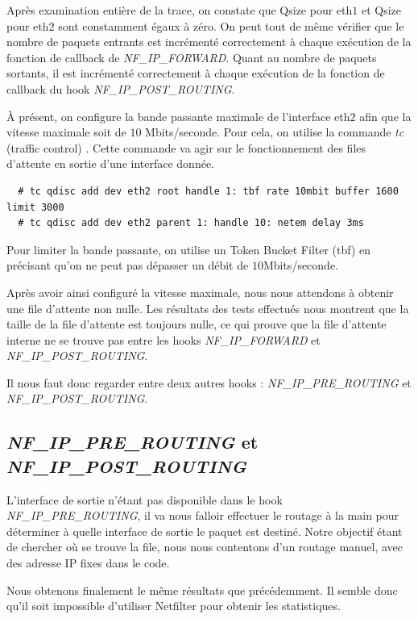\documentclass[a4paper]{article}
\begin{document}
Après examination entière de la trace, on constate que Qsize
pour eth$1$ et Qsize pour eth$2$ sont constamment égaux à zéro.
On peut tout de même vérifier que le nombre de paquets entrants
est incrémenté correctement à chaque exécution de la fonction
de callback de \textit{NF\_IP\_FORWARD}. Quant au nombre de paquets
sortants, il est incrémenté correctement à chaque exécution de la
fonction de callback du hook \textit{NF\_IP\_POST\_ROUTING}.

À présent, on configure la bande passante maximale de l'interface
eth$2$ afin que la vitesse maximale soit de $10$ Mbits/seconde.
Pour cela, on utilise la commande \textit{tc} (traffic control) \cite{tc1} \cite{tcman}.
Cette commande va agir sur le fonctionnement des files d’attente
en sortie d’une interface donnée.
\begin{verbatim}
  # tc qdisc add dev eth2 root handle 1: tbf rate 10mbit buffer 1600 limit 3000
  # tc qdisc add dev eth2 parent 1: handle 10: netem delay 3ms
\end{verbatim}
Pour limiter la bande passante, on utilise un Token Bucket Filter
(tbf) en précisant qu’on ne peut pas dépasser un débit de
$10$Mbits/seconde.

Après avoir ainsi configuré la vitesse maximale,
nous nous attendons à obtenir une file d’attente non nulle.
Les résultats des tests effectués nous montrent que la taille
de la file d’attente est toujours nulle, ce qui prouve que la
file d’attente interne ne se trouve pas entre les hooks
\textit{NF\_IP\_FORWARD} et \textit{NF\_IP\_POST\_ROUTING}.

Il nous faut donc regarder entre deux autres 
hooks : \textit{NF\_IP\_PRE\_ROUTING} et \textit{NF\_IP\_POST\_ROUTING}.

\subsection{\textit{NF\_IP\_PRE\_ROUTING} et \textit{NF\_IP\_POST\_ROUTING}}
L'interface de sortie n'étant pas disponible dans le hook \textit{NF\_IP\_PRE\_ROUTING},
il va nous falloir effectuer le routage à la main pour déterminer à quelle interface de sortie le paquet est destiné. Notre
objectif étant de chercher où se trouve la file, nous nous
contentons d'un routage manuel, avec des adresse IP fixes dans le code.

Nous obtenons finalement le même résultats que précédemment. 
Il semble donc qu'il soit impossible d'utiliser Netfilter pour
obtenir les statistiques. 
\end{document}
